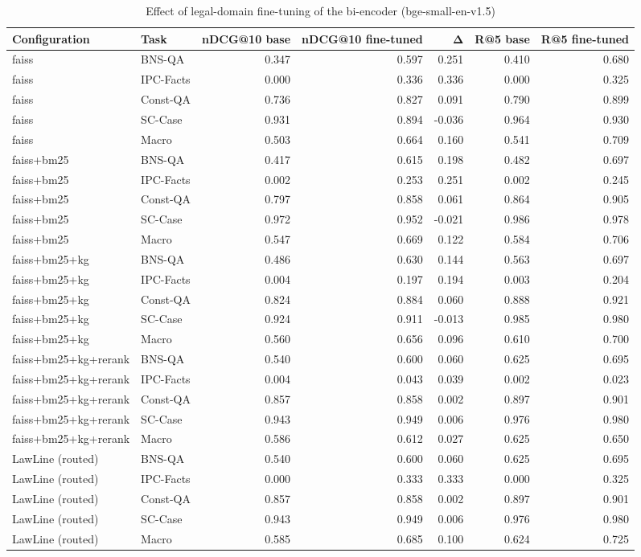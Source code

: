 \begin{table}
\caption{Effect of legal-domain fine-tuning of the bi-encoder (bge-small-en-v1.5)}
\label{tab:finetune}
\begin{tabular}{llrrrrr}
\toprule
Configuration & Task & nDCG@10 base & nDCG@10 fine-tuned & Δ & R@5 base & R@5 fine-tuned \\
\midrule
faiss & BNS-QA & 0.347 & 0.597 & 0.251 & 0.410 & 0.680 \\
faiss & IPC-Facts & 0.000 & 0.336 & 0.336 & 0.000 & 0.325 \\
faiss & Const-QA & 0.736 & 0.827 & 0.091 & 0.790 & 0.899 \\
faiss & SC-Case & 0.931 & 0.894 & -0.036 & 0.964 & 0.930 \\
faiss & Macro & 0.503 & 0.664 & 0.160 & 0.541 & 0.709 \\
faiss+bm25 & BNS-QA & 0.417 & 0.615 & 0.198 & 0.482 & 0.697 \\
faiss+bm25 & IPC-Facts & 0.002 & 0.253 & 0.251 & 0.002 & 0.245 \\
faiss+bm25 & Const-QA & 0.797 & 0.858 & 0.061 & 0.864 & 0.905 \\
faiss+bm25 & SC-Case & 0.972 & 0.952 & -0.021 & 0.986 & 0.978 \\
faiss+bm25 & Macro & 0.547 & 0.669 & 0.122 & 0.584 & 0.706 \\
faiss+bm25+kg & BNS-QA & 0.486 & 0.630 & 0.144 & 0.563 & 0.697 \\
faiss+bm25+kg & IPC-Facts & 0.004 & 0.197 & 0.194 & 0.003 & 0.204 \\
faiss+bm25+kg & Const-QA & 0.824 & 0.884 & 0.060 & 0.888 & 0.921 \\
faiss+bm25+kg & SC-Case & 0.924 & 0.911 & -0.013 & 0.985 & 0.980 \\
faiss+bm25+kg & Macro & 0.560 & 0.656 & 0.096 & 0.610 & 0.700 \\
faiss+bm25+kg+rerank & BNS-QA & 0.540 & 0.600 & 0.060 & 0.625 & 0.695 \\
faiss+bm25+kg+rerank & IPC-Facts & 0.004 & 0.043 & 0.039 & 0.002 & 0.023 \\
faiss+bm25+kg+rerank & Const-QA & 0.857 & 0.858 & 0.002 & 0.897 & 0.901 \\
faiss+bm25+kg+rerank & SC-Case & 0.943 & 0.949 & 0.006 & 0.976 & 0.980 \\
faiss+bm25+kg+rerank & Macro & 0.586 & 0.612 & 0.027 & 0.625 & 0.650 \\
LawLine (routed) & BNS-QA & 0.540 & 0.600 & 0.060 & 0.625 & 0.695 \\
LawLine (routed) & IPC-Facts & 0.000 & 0.333 & 0.333 & 0.000 & 0.325 \\
LawLine (routed) & Const-QA & 0.857 & 0.858 & 0.002 & 0.897 & 0.901 \\
LawLine (routed) & SC-Case & 0.943 & 0.949 & 0.006 & 0.976 & 0.980 \\
LawLine (routed) & Macro & 0.585 & 0.685 & 0.100 & 0.624 & 0.725 \\
\bottomrule
\end{tabular}
\end{table}
